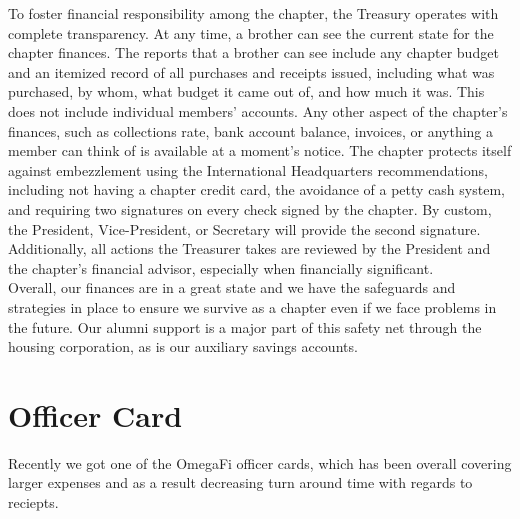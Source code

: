     To foster financial responsibility among the chapter, the Treasury operates with complete transparency. At any time, a brother can see the current state for the chapter finances. The reports that a brother can see include any chapter budget and an itemized record of all purchases and receipts issued, including what was purchased, by whom, what budget it came out of, and how much it was. This does not include individual members' accounts. Any other aspect of the chapter's finances, such as collections rate, bank account balance, invoices, or anything a member can think of is available at a moment's notice. The chapter protects itself against embezzlement using the International Headquarters recommendations, including not having a chapter credit card, the avoidance of a petty cash system, and requiring two signatures on every check signed by the chapter. By custom, the President, Vice-President, or Secretary will provide the second signature. Additionally, all actions the Treasurer takes are reviewed by the President and the chapter’s financial advisor, especially when financially significant. \\

    Overall, our finances are in a great state and we have the safeguards and strategies in place to ensure we survive as a chapter even if we face problems in the future. Our alumni support is a major part of this safety net through the housing corporation, as is our auxiliary savings accounts.
    
    \section*{Officer Card}
    
    Recently we got one of the OmegaFi officer cards, which has been overall covering larger expenses and as a result decreasing turn around time with regards to reciepts.